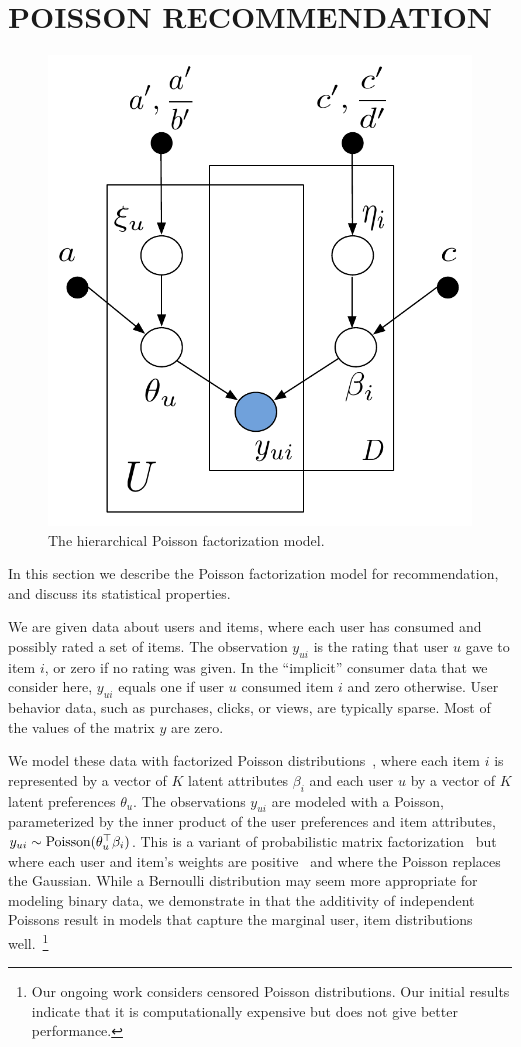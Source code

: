 \section{POISSON RECOMMENDATION}
\label{sec:model}

\begin{figure}[t]
\begin{center}
\includegraphics[width=0.5\columnwidth]{figures/hpf.pdf}
\caption{\small{The hierarchical Poisson factorization model.}}
\label{fig:hpf}
\end{center}
\end{figure}


In this section we describe the Poisson factorization model for
recommendation, and discuss its statistical properties.

We are given data about users and items, where each user has consumed
and possibly rated a set of items.  The observation $y_{ui}$ is the
rating that user $u$ gave to item $i$, or zero if no rating was given.
In the ``implicit'' consumer data that we consider here, $y_{ui}$
equals one if user $u$ consumed item $i$ and zero otherwise.  User
behavior data, such as purchases, clicks, or views, are typically
sparse.  Most of the values of the matrix $y$ are zero.

We model these data with factorized Poisson
distributions~\cite{Canny:2004}, where each item $i$ is represented by
a vector of $K$ latent attributes $\beta_i$ and each user $u$ by a
vector of $K$ latent preferences $\theta_u$.  The observations $y_{ui}$
are modeled with a Poisson, parameterized by the inner product of
the user preferences and item attributes, $y_{ui} \sim
\textrm{Poisson}(\theta_u^\top \beta_i)$.  This is a variant of probabilistic
matrix factorization~\cite{Salakhutdinov:2008a} but where each user
and item's weights are positive~\cite{Lee:1999} and where the Poisson
replaces the Gaussian.
While a Bernoulli distribution may seem more appropriate for modeling
binary data, we demonstrate in  that the additivity
of independent Poissons result in models that capture the marginal
user, item distributions well.~\footnote{Our ongoing work considers
  censored Poisson distributions. Our initial results indicate that it
  is computationally expensive but does not give better performance.}

